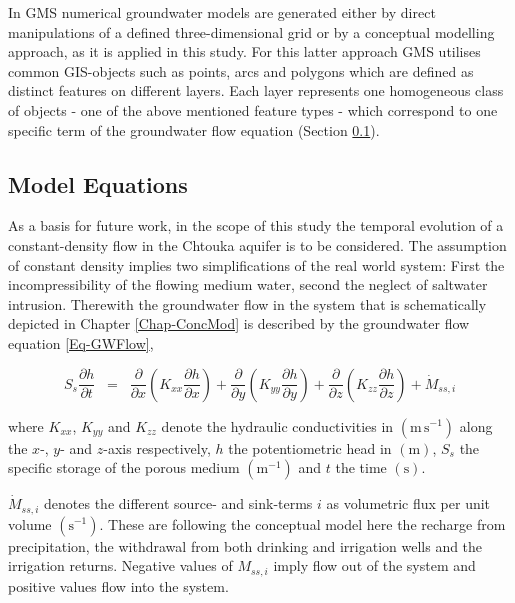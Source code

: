 In GMS numerical groundwater models are generated either by direct manipulations of a defined three-dimensional grid or by a conceptual modelling approach, as it is applied in this study. For this latter approach GMS utilises common GIS-objects such as points, arcs and polygons which are defined as distinct features on different layers. Each layer represents one homogeneous class of objects - one of the above mentioned feature types - which correspond to one specific term of the groundwater flow equation (Section \ref{Sec-ModEq}).


\subsection{Model Equations}
\label{Sec-ModEq}

As a basis for future work, in the scope of this study the temporal evolution of a constant-density flow in the Chtouka aquifer is to be considered. The assumption of constant density implies two simplifications of the real world system: First the incompressibility of the flowing medium water, second the neglect of saltwater intrusion. Therewith the groundwater flow in the system that is schematically depicted in Chapter \ref{Chap-ConcMod} is described by the groundwater flow equation \eqref{Eq-GWFlow},

\begin{equation}
    S_s \frac{\partial h}{\partial t} \; \; = \; \; \frac{\partial}{\partial x} \left(K_{xx} \frac{\partial h}{\partial x} \right) + \frac{\partial}{\partial y} \left(K_{yy} \frac{\partial h}{\partial y} \right) + \frac{\partial}{\partial z} \left(K_{zz} \frac{\partial h}{\partial z} \right) + \dot{M}_{ss,i}
\end{equation}

where $K_{xx}$, $K_{yy}$ and $K_{zz}$ denote the hydraulic conductivities in $\left( \textrm{m} \, \textrm{s}^{-1} \right)$ along the $x$-, $y$- and $z$-axis respectively, $h$ the potentiometric head in $\left( \textrm{m} \right)$, $S_s$ the specific storage of the porous medium $\left( \textrm{m}^{-1} \right)$ and $t$ the time $\left( \textrm{s} \right)$.

$\dot{M}_{ss,i}$ denotes the different source- and sink-terms $i$ as volumetric flux per unit volume $\left( \textrm{s}^{-1} \right)$. These are following the conceptual model here the recharge from precipitation, the withdrawal from both drinking and irrigation wells and the irrigation returns. Negative values of $M_{ss,i}$ imply flow out of the system and positive values flow into the system.

